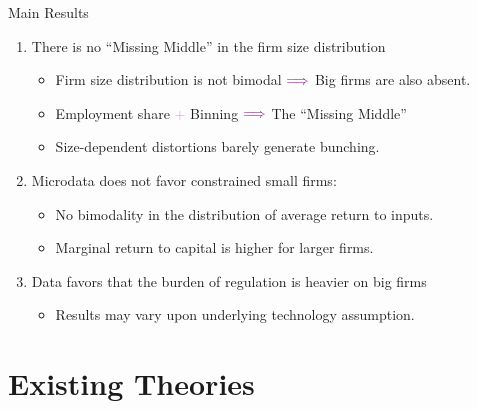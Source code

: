 \documentclass[usenames,dvipsnames,aspectratio=169]{beamer}
\begin{document}
\begin{frame}{Main Results}
    \begin{enumerate}[label=\textbf{\textcolor{violet}{\arabic*.}}]
        \item There is no ``Missing Middle'' in the firm size distribution
        \begin{itemize}[label=\textcolor{violet}{$\blacktriangleright$}]
            \item Firm size distribution is not bimodal $\textcolor{violet}{\Longrightarrow}$ Big firms are also absent.
            \item Employment share \textcolor{violet}{+} Binning $\textcolor{violet}{\Longrightarrow}$ The ``Missing Middle'' 
            \item Size-dependent distortions barely generate bunching. 
        \end{itemize}
        \vfill
        \item Microdata does not favor constrained small firms:
        \begin{itemize}[label=\textcolor{violet}{$\blacktriangleright$}]
            \item No bimodality in the distribution of average return to inputs. 
            \item Marginal return to capital is higher for larger firms. 
        \end{itemize}            
        \vfill
        \item Data favors that the burden of regulation is heavier on big firms
        \begin{itemize}[label=\textcolor{violet}{$\blacktriangleright$}]
            \item Results may vary upon underlying technology assumption. 
        \end{itemize}
    \end{enumerate}
\end{frame}

\section{Existing Theories}
\end{document}

